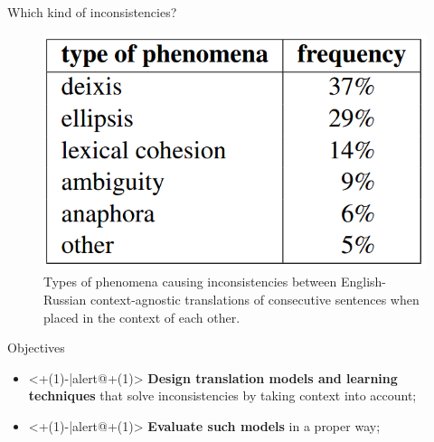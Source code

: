 \begin{frame}{Which kind of inconsistencies?}
	\begin{figure}
		\centering
		\includegraphics[width=0.7\linewidth]{Images/phenomena}
		\caption{Types of phenomena causing inconsistencies between English-Russian context-agnostic  translations  of  consecutive  sentences when placed in the context of each other.}
		\label{fig:phenomena}
	\end{figure}	
\end{frame}

\begin{frame}{Objectives}
	\begin{itemize}
		\item<+(1)-|alert@+(1)> \textbf{Design translation models and learning techniques} that solve inconsistencies by taking context into account;
		\item<+(1)-|alert@+(1)> \textbf{Evaluate such models} in a proper way;
	\end{itemize}
\end{frame}
